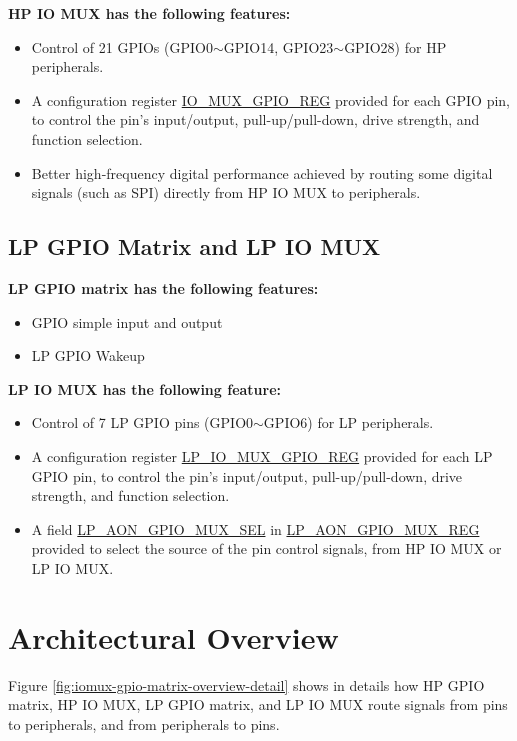 \documentclass[main\_\_EN.tex]{subfiles}
\begin{document}
\textbf{HP IO MUX has the following features:}

\begin{itemize}
\item Control of 21 GPIOs (GPIO0$\sim$GPIO14, GPIO23$\sim$GPIO28) for HP peripherals.
\item A configuration register \hyperref[regdesc:IOMUXGPIONREG]{IO\_MUX\_GPIO\_REG} provided for each GPIO pin, to control the pin's input/output, pull-up/pull-down, drive strength, and function selection.
\item Better high-frequency digital performance achieved by routing some digital signals (such as SPI) directly from HP IO MUX to peripherals.

\end{itemize}
\subsection{LP GPIO Matrix and LP IO MUX}
\textbf{LP GPIO matrix has the following features:}

\begin{itemize}
\item GPIO simple input and output
\item LP GPIO Wakeup
\end{itemize}

\textbf{LP IO MUX has the following feature:}

\begin{itemize}
    \item Control of 7 LP GPIO pins (GPIO0$\sim$GPIO6) for LP peripherals.
    \item A configuration register \hyperref[regdesc:LPIOMUXGPIONREG]{LP\_IO\_MUX\_GPIO\_REG} provided for each LP GPIO pin, to control the pin's input/output, pull-up/pull-down, drive strength, and function selection.
    \item A field \hyperref[fielddesc:LPAONGPIOMUXSEL]{LP\_AON\_GPIO\_MUX\_SEL} in \hyperref[regdesc:LPAONGPIOMUXREG]{LP\_AON\_GPIO\_MUX\_REG} provided to select the source of the pin control signals, from HP IO MUX or LP IO MUX.
\end{itemize}

\section{Architectural Overview}
Figure \ref{fig:iomux-gpio-matrix-overview-detail} shows in details how HP GPIO matrix, HP IO MUX, LP GPIO matrix, and LP IO MUX route signals from pins to peripherals, and from peripherals to pins.
\end{document}
